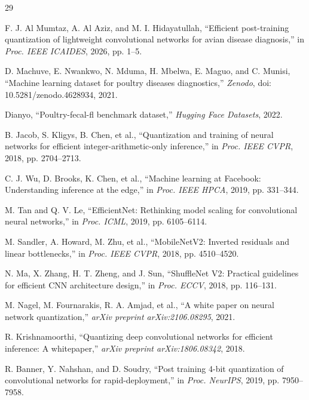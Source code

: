 \documentclass{jcse}
\begin{document}
\newpage
\begin{thebibliography}{29}
\fontsize{6.2pt}{7.4pt}\selectfont
\setlength{\itemsep}{-1.0pt}
\setlength{\parskip}{0pt}

F. J. Al Mumtaz, A. Al Aziz, and M. I. Hidayatullah, ``Efficient post-training quantization of lightweight convolutional networks for avian disease diagnosis,'' in \textit{Proc. IEEE ICAIDES}, 2026, pp. 1--5.

D. Machuve, E. Nwankwo, N. Mduma, H. Mbelwa, E. Maguo, and C. Munisi, ``Machine learning dataset for poultry diseases diagnostics,'' \textit{Zenodo}, doi: 10.5281/zenodo.4628934, 2021.

Dianyo, ``Poultry-fecal-fl benchmark dataset,'' \textit{Hugging Face Datasets}, 2022.

B. Jacob, S. Kligys, B. Chen, et al., ``Quantization and training of neural networks for efficient integer-arithmetic-only inference,'' in \textit{Proc. IEEE CVPR}, 2018, pp. 2704--2713.

C. J. Wu, D. Brooks, K. Chen, et al., ``Machine learning at Facebook: Understanding inference at the edge,'' in \textit{Proc. IEEE HPCA}, 2019, pp. 331--344.

M. Tan and Q. V. Le, ``EfficientNet: Rethinking model scaling for convolutional neural networks,'' in \textit{Proc. ICML}, 2019, pp. 6105--6114.

M. Sandler, A. Howard, M. Zhu, et al., ``MobileNetV2: Inverted residuals and linear bottlenecks,'' in \textit{Proc. IEEE CVPR}, 2018, pp. 4510--4520.

N. Ma, X. Zhang, H. T. Zheng, and J. Sun, ``ShuffleNet V2: Practical guidelines for efficient CNN architecture design,'' in \textit{Proc. ECCV}, 2018, pp. 116--131.

M. Nagel, M. Fournarakis, R. A. Amjad, et al., ``A white paper on neural network quantization,'' \textit{arXiv preprint arXiv:2106.08295}, 2021.

R. Krishnamoorthi, ``Quantizing deep convolutional networks for efficient inference: A whitepaper,'' \textit{arXiv preprint arXiv:1806.08342}, 2018.

R. Banner, Y. Nahshan, and D. Soudry, ``Post training 4-bit quantization of convolutional networks for rapid-deployment,'' in \textit{Proc. NeurIPS}, 2019, pp. 7950--7958.


\end{thebibliography}
\end{document}
